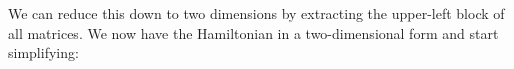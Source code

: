 
We can reduce this down to two dimensions by extracting the upper-left block of all matrices. We now have the Hamiltonian in a two-dimensional form and start simplifying:

